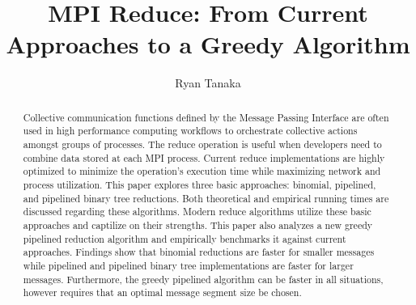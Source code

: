 \documentclass{article}
\begin{document}
\title{MPI Reduce: From Current Approaches to a Greedy Algorithm}
\author{Ryan Tanaka}

\maketitle

\begin{abstract}
Collective communication functions defined by the Message Passing Interface are often used in high 
performance computing workflows to orchestrate collective actions amongst groups of processes.
The reduce operation is useful when developers need to combine data stored at each MPI process. 
Current reduce implementations are highly optimized to minimize the operation's execution time 
while maximizing network and process utilization. This paper explores three basic approaches: 
binomial, pipelined, and pipelined binary tree reductions. Both theoretical 
and empirical running times are discussed regarding these algorithms. Modern reduce algorithms 
utilize these basic approaches and captilize on their strengths. This paper also analyzes a new 
greedy pipelined reduction algorithm and empirically benchmarks it against current approaches. 
Findings show that binomial reductions are faster for smaller messages while pipelined and pipelined
binary tree implementations are faster for larger messages. Furthermore, the greedy pipelined 
algorithm can be faster in all situations, however requires that an optimal message segment size
be chosen.
\end{abstract}
\end{document}
